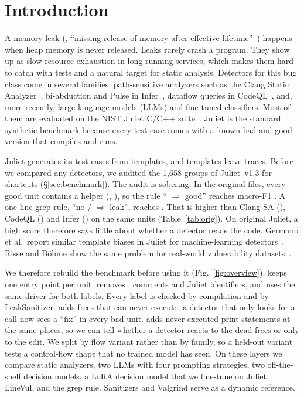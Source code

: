 \section{Introduction}
\label{sec:intro}

A memory leak (\cwe{}, ``missing release of memory after effective lifetime''~\cite{mitrecwe401}) happens when heap memory is never released.
Leaks rarely crash a program.
They show up as slow resource exhaustion in long-running services, which makes them hard to catch with tests and a natural target for static analysis.
Detectors for this bug class come in several families: path-sensitive analyzers such as the Clang Static Analyzer~\cite{clangsa}, bi-abduction and Pulse in Infer~\cite{calcagno2009biabduction,le2022pulse}, dataflow queries in CodeQL~\cite{codeqldocs}, and, more recently, large language models (LLMs) and fine-tuned classifiers.
Most of them are evaluated on the NIST Juliet C/C++ suite~\cite{boland2012juliet,sard}.
Juliet is the standard synthetic benchmark because every test case comes with a known bad and good version that compiles and runs.

Juliet generates its test cases from templates, and templates leave traces.
Before we compared any detectors, we audited the 1,658 \cwe{} groups of Juliet~v1.3 for shortcuts (\S\ref{sec:benchmark}).
The audit is sobering.
In the original files, every good unit contains a  helper (, ), so the rule `` $\Rightarrow$ good'' reaches macro-F1 .
A one-line grep rule, ``no / $\Rightarrow$ leak'', reaches .
That is higher than Clang SA (), CodeQL () and Infer () on the same units (Table~\ref{tab:orig}).
On original Juliet, a high score therefore says little about whether a detector reads the code.
Germano et al.\ report similar template biases in Juliet for machine-learning detectors~\cite{germano2025biased}.
Risse and B\"ohme show the same problem for real-world vulnerability datasets~\cite{risse2024limits,risse2025topscore}.

We therefore rebuild the benchmark before using it (Fig.~\ref{fig:overview}).
\Deb{} keeps one entry point per unit, removes , comments and Juliet identifiers, and uses the same driver for both labels.
Every label is checked by compilation and by LeakSanitizer.
\Dead{} adds frees that can never execute; a detector that only looks for a  call now sees a ``fix'' in every bad unit.
\Plac{} adds never-executed print statements at the same places, so we can tell whether a detector reacts to the dead frees or only to the edit.
We split by flow variant rather than by family, so a held-out variant tests a control-flow shape that no trained model has seen.
On these layers we compare static analyzers, two LLMs with four prompting strategies, two off-the-shelf decision models, a LoRA decision model that we fine-tune on Juliet, LineVul, and the grep rule.
Sanitizers and Valgrind serve as a dynamic reference.

